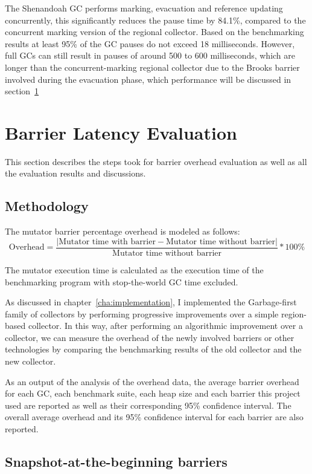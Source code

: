 The Shenandoah GC performs marking, evacuation and reference updating concurrently,
this significantly reduces the pause time by 84.1\%, compared to the concurrent marking version
of the regional collector. Based on the benchmarking results at least 95\% of
the GC pauses do not exceed 18 milliseconds. However, full GCs can still result
in pauses of around 500 to 600 milliseconds, which are longer than the concurrent-marking
regional collector due to the Brooks barrier involved during the evacuation phase, which performance
will be discussed in section~\ref{sec:barrierlatency}

\section{Barrier Latency Evaluation} %
\label{sec:barrierlatency}

This section describes the steps took for barrier overhead evaluation as well as
all the evaluation results and discussions.

\subsection{Methodology}

The mutator barrier percentage overhead is modeled as follows:
$$
\text{Overhead} = \frac{|\text{Mutator time with barrier} - \text{Mutator time without barrier}|}{\text{Mutator time without barrier}} * 100\%
$$

The mutator execution time is calculated as the execution time of the benchmarking program with
stop-the-world GC time excluded.

As discussed in chapter~\ref{cha:implementation}, I implemented the Garbage-first
family of collectors by performing progressive improvements over a simple region-based collector.
In this way, after performing an algorithmic improvement over a collector, we can measure the overhead of
the newly involved barriers or other technologies by comparing the benchmarking results
of the old collector and the new collector.

As an output of the analysis of the overhead data, the average barrier overhead
for each GC, each benchmark suite, each heap size and each barrier this project used are reported
as well as their corresponding 95\% confidence interval.
The overall average overhead and its 95\% confidence interval for each barrier are also reported.

\subsection{Snapshot-at-the-beginning barriers}

